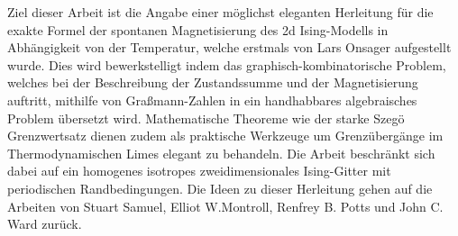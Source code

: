 
\noindent Ziel dieser Arbeit ist die Angabe einer möglichst eleganten Herleitung für die exakte Formel der spontanen Magnetisierung des 2d Ising-Modells in Abhängigkeit von der Temperatur, welche erstmals von Lars Onsager aufgestellt wurde. Dies wird bewerkstelligt indem das graphisch-kombinatorische Problem, welches bei der Beschreibung der Zustandssumme und der Magnetisierung auftritt, mithilfe von Graßmann-Zahlen in ein handhabbares algebraisches Problem übersetzt wird. Mathematische Theoreme wie der starke Szegö Grenzwertsatz dienen zudem als praktische Werkzeuge um Grenzübergänge im Thermodynamischen Limes elegant zu behandeln. Die Arbeit beschränkt sich dabei auf ein homogenes isotropes zweidimensionales Ising-Gitter mit periodischen Randbedingungen. Die Ideen zu dieser Herleitung gehen auf die Arbeiten von Stuart Samuel, Elliot W.Montroll, Renfrey B. Potts und John C. Ward zurück. 